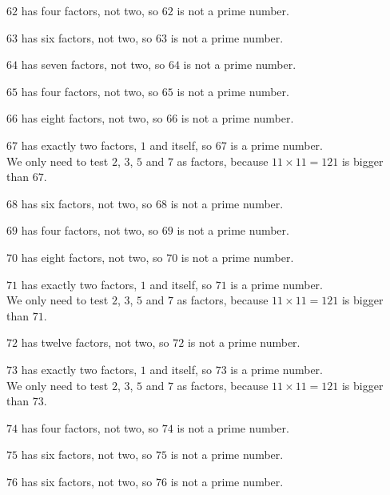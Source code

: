 \documentclass[aspectratio=169]{beamer}
\begin{document}
  {$62$ has four factors, not two, so $62$ is not a prime number.}

  {$63$ has six factors, not two, so $63$ is not a prime number.}

  {$64$ has seven factors, not two, so $64$ is not a prime number.}

  {$65$ has four factors, not two, so $65$ is not a prime number.}

  {$66$ has eight factors, not two, so $66$ is not a prime number.}

  {$67$ has exactly two factors, $1$ and itself, so $67$ is a prime number.\\[0.45em]We only need to test $2$, $3$, $5$ and $7$ as factors, because $11\times 11=121$ is bigger than $67$.}

  {$68$ has six factors, not two, so $68$ is not a prime number.}

  {$69$ has four factors, not two, so $69$ is not a prime number.}

  {$70$ has eight factors, not two, so $70$ is not a prime number.}

  {$71$ has exactly two factors, $1$ and itself, so $71$ is a prime number.\\[0.45em]We only need to test $2$, $3$, $5$ and $7$ as factors, because $11\times 11=121$ is bigger than $71$.}

  {$72$ has twelve factors, not two, so $72$ is not a prime number.}

  {$73$ has exactly two factors, $1$ and itself, so $73$ is a prime number.\\[0.45em]We only need to test $2$, $3$, $5$ and $7$ as factors, because $11\times 11=121$ is bigger than $73$.}

  {$74$ has four factors, not two, so $74$ is not a prime number.}

  {$75$ has six factors, not two, so $75$ is not a prime number.}

  {$76$ has six factors, not two, so $76$ is not a prime number.}
\end{document}
